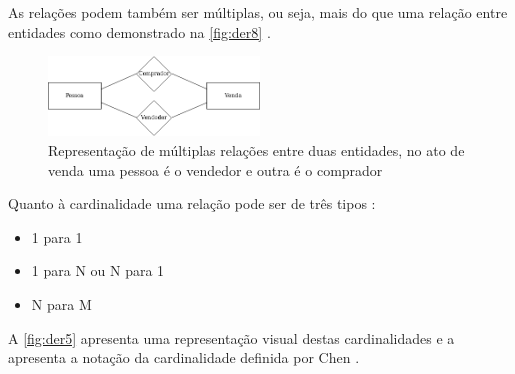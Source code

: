 \documentclass[11pt,twoside,a4paper]{report}
\begin{document}
\newpage
As relações podem também ser múltiplas, ou seja, mais do que uma relação entre entidades como demonstrado na \autoref{fig:der8} \cite{analise_requisitos}.
\begin{figure}[H]
	\begin{center}
		\includegraphics[width=0.5\textwidth]{notacao7} %
		\caption[Representação de múltiplas relações entre duas entidades]{Representação de múltiplas relações entre duas entidades, no ato de venda uma pessoa é o vendedor e outra é o comprador}
		\label{fig:der8}
	\end{center}
\end{figure}
Quanto à cardinalidade uma relação pode ser de três tipos \cite{analise_requisitos}:
\begin{itemize}[noitemsep]
	\item 1 para 1
	\item 1 para N ou N para 1
	\item N para M
\end{itemize}
A \autoref{fig:der5} apresenta uma representação visual destas cardinalidades e a  apresenta a notação da cardinalidade definida por Chen \cite{analise_requisitos, Chen}.
\end{document}

